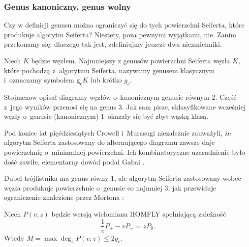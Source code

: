 
\subsubsection{Genus kanoniczny, genus wolny}
Czy w definicji genusu można ograniczyć się do tych powierzchni Seiferta, które produkuje algorytm Seiferta?
%
Niestety, poza pewnymi wyjątkami, nie.
Zanim przekonamy się, dlaczego tak jest, zdefiniujmy jeszcze dwa niezmienniki.

\begin{definition}
%
    Niech $K$ będzie węzłem.
    Najmniejszy z genusów powierzchni Seiferta węzła $K$, które pochodzą z~algorytmu Seiferta, nazywamy genusem klasycznym i~oznaczamy symbolem $\operatorname{g_c} K$ lub krótko $g_c$.
\end{definition}

Stojmenow \cite{stoimenow08} opisał diagramy węzłów o~kanonicznym genusie równym 2.
%
Część z~jego wyników przenosi się na genus 3.
Jak sam pisze, sklasyfikowane wcześniej węzły o~genusie (kanonicznym) 1~okazały się być zbyt wąską klasą.

Pod koniec lat pięćdziesiątych Crowell i~Murasugi niezależnie zauważyli, że algorytm Seiferta zastosowany do alternującego diagramu zawsze daje powierzchnię o~minimalnej powierzchni.
%
%
Ich kombinatoryczne uzasadnienie było dość zawiłe, elementarny dowód podał Gabai \cite{gabai86}.
%

Dubel trójlistnika ma genus równy $1$, ale algorytm Seiferta zastosowany wobec węzła produkuje powierzchnie o~genusie co najmniej $3$, jak przewiduje ograniczenie znalezione przez Mortona \cite[twierdzenie 2]{morton86}:
%

\begin{proposition}
    Niech $P(v, z)$ będzie wersją wielomianu HOMFLY spełniającą zależność
    \begin{equation}
        \frac 1v P_+ - vP_- = zP_0.
    \end{equation}
    Wtedy $M = \max \deg_z P(v, z) \le 2g_c$.
%
\end{proposition}

